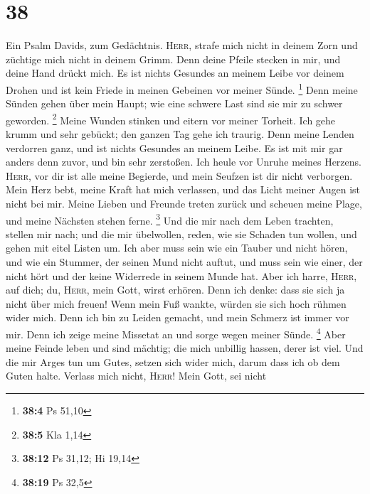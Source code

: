 \hypertarget{section-16}{%
\section{38}\label{section-16}}

 Ein Psalm Davids, zum Gedächtnis. 
\textsc{Herr}, strafe mich nicht in deinem Zorn und züchtige mich nicht
in deinem Grimm.  Denn deine Pfeile stecken in mir, und
deine Hand drückt mich.  Es ist nichts Gesundes an meinem
Leibe vor deinem Drohen und ist kein Friede in meinen Gebeinen vor
meiner Sünde. \footnote{\textbf{38:4} Ps 51,10}  Denn
meine Sünden gehen über mein Haupt; wie eine schwere Last sind sie mir
zu schwer geworden. \footnote{\textbf{38:5} Kla 1,14} 
Meine Wunden stinken und eitern vor meiner Torheit.  Ich
gehe krumm und sehr gebückt; den ganzen Tag gehe ich traurig.
 Denn meine Lenden verdorren ganz, und ist nichts Gesundes
an meinem Leibe.  Es ist mit mir gar anders denn zuvor,
und bin sehr zerstoßen. Ich heule vor Unruhe meines Herzens.
 \textsc{Herr}, vor dir ist alle meine Begierde, und mein
Seufzen ist dir nicht verborgen.  Mein Herz bebt, meine
Kraft hat mich verlassen, und das Licht meiner Augen ist nicht bei mir.
 Meine Lieben und Freunde treten zurück und scheuen meine
Plage, und meine Nächsten stehen ferne. \footnote{\textbf{38:12} Ps
  31,12; Hi 19,14}  Und die mir nach dem Leben trachten,
stellen mir nach; und die mir übelwollen, reden, wie sie Schaden tun
wollen, und gehen mit eitel Listen um.  Ich aber muss
sein wie ein Tauber und nicht hören, und wie ein Stummer, der seinen
Mund nicht auftut,  und muss sein wie einer, der nicht
hört und der keine Widerrede in seinem Munde hat.  Aber
ich harre, \textsc{Herr}, auf dich; du, \textsc{Herr}, mein Gott, wirst
erhören.  Denn ich denke: dass sie sich ja nicht über
mich freuen! Wenn mein Fuß wankte, würden sie sich hoch rühmen wider
mich.  Denn ich bin zu Leiden gemacht, und mein Schmerz
ist immer vor mir.  Denn ich zeige meine Missetat an und
sorge wegen meiner Sünde. \footnote{\textbf{38:19} Ps 32,5}
 Aber meine Feinde leben und sind mächtig; die mich
unbillig hassen, derer ist viel.  Und die mir Arges tun
um Gutes, setzen sich wider mich, darum dass ich ob dem Guten halte.
 Verlass mich nicht, \textsc{Herr}! Mein Gott, sei nicht
